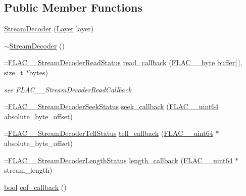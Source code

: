 \subsection*{Public Member Functions}
\begin{DoxyCompactItemize}
\item 
\hyperlink{class_stream_decoder_a041d462db52d6827b96c9f919ce7d858}{Stream\+Decoder} (\hyperlink{decoders_8c_a9a8118be7780e95363d631cbca7e7800}{Layer} layer)
\item 
\hyperlink{class_stream_decoder_abd7d3063f9a5c6cf2ce9ae077ef2398b}{$\sim$\+Stream\+Decoder} ()
\item 
\+::\hyperlink{group__flac__stream__decoder_gad793ead451206c64a91dc0b851027b93}{F\+L\+A\+C\+\_\+\+\_\+\+Stream\+Decoder\+Read\+Status} \hyperlink{class_stream_decoder_ae067d65198e57137fc5cca801239d3cb}{read\+\_\+callback} (\hyperlink{ordinals_8h_a5eb569b12d5b047cdacada4d57924ee3}{F\+L\+A\+C\+\_\+\+\_\+byte} \hyperlink{structbuffer}{buffer}\mbox{[}$\,$\mbox{]}, size\+\_\+t $\ast$bytes)
\begin{DoxyCompactList}\small\item\em see F\+L\+A\+C\+\_\+\+\_\+\+Stream\+Decoder\+Read\+Callback \end{DoxyCompactList}\item 
\+::\hyperlink{group__flac__stream__decoder_gac8d269e3c7af1a5889d3bd38409ed67d}{F\+L\+A\+C\+\_\+\+\_\+\+Stream\+Decoder\+Seek\+Status} \hyperlink{class_stream_decoder_a58ea72f73c35b984ccba40cc664399f8}{seek\+\_\+callback} (\hyperlink{ordinals_8h_aa78c8c70a3eb8a58af7436f278acde8e}{F\+L\+A\+C\+\_\+\+\_\+uint64} absolute\+\_\+byte\+\_\+offset)
\item 
\+::\hyperlink{group__flac__stream__decoder_ga83708207969383bd7b5c1e9148528845}{F\+L\+A\+C\+\_\+\+\_\+\+Stream\+Decoder\+Tell\+Status} \hyperlink{class_stream_decoder_aba4dfff591aea02511911e11e16f796c}{tell\+\_\+callback} (\hyperlink{ordinals_8h_aa78c8c70a3eb8a58af7436f278acde8e}{F\+L\+A\+C\+\_\+\+\_\+uint64} $\ast$absolute\+\_\+byte\+\_\+offset)
\item 
\+::\hyperlink{group__flac__stream__decoder_gad5860157c2bb34501b8b9370472d727a}{F\+L\+A\+C\+\_\+\+\_\+\+Stream\+Decoder\+Length\+Status} \hyperlink{class_stream_decoder_a7368850ceef7b82e861cb17df8d54c30}{length\+\_\+callback} (\hyperlink{ordinals_8h_aa78c8c70a3eb8a58af7436f278acde8e}{F\+L\+A\+C\+\_\+\+\_\+uint64} $\ast$stream\+\_\+length)
\item 
\hyperlink{mac_2config_2i386_2lib-src_2libsoxr_2soxr-config_8h_abb452686968e48b67397da5f97445f5b}{bool} \hyperlink{class_stream_decoder_a45715d3e1b603d4ce6c4ea8dacaef8a3}{eof\+\_\+callback} ()

\end{DoxyCompactItemize}
